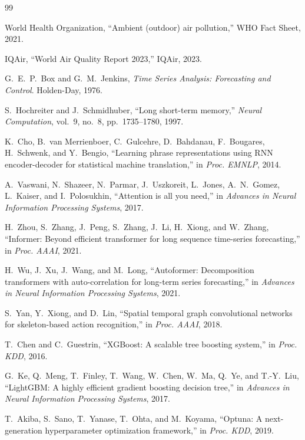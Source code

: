 \begin{thebibliography}{99}

World Health Organization, ``Ambient (outdoor) air pollution,'' WHO Fact Sheet, 2021.

IQAir, ``World Air Quality Report 2023,'' IQAir, 2023.

G.~E.~P.~Box and G.~M.~Jenkins, \textit{Time Series Analysis: Forecasting and Control}. Holden-Day, 1976.

S.~Hochreiter and J.~Schmidhuber, ``Long short-term memory,'' \textit{Neural Computation}, vol.~9, no.~8, pp.~1735--1780, 1997.

K.~Cho, B.~van Merrienboer, C.~Gulcehre, D.~Bahdanau, F.~Bougares, H.~Schwenk, and Y.~Bengio, ``Learning phrase representations using RNN encoder-decoder for statistical machine translation,'' in \textit{Proc. EMNLP}, 2014.

A.~Vaswani, N.~Shazeer, N.~Parmar, J.~Uszkoreit, L.~Jones, A.~N.~Gomez, L.~Kaiser, and I.~Polosukhin, ``Attention is all you need,'' in \textit{Advances in Neural Information Processing Systems}, 2017.

H.~Zhou, S.~Zhang, J.~Peng, S.~Zhang, J.~Li, H.~Xiong, and W.~Zhang, ``Informer: Beyond efficient transformer for long sequence time-series forecasting,'' in \textit{Proc. AAAI}, 2021.

H.~Wu, J.~Xu, J.~Wang, and M.~Long, ``Autoformer: Decomposition transformers with auto-correlation for long-term series forecasting,'' in \textit{Advances in Neural Information Processing Systems}, 2021.

S.~Yan, Y.~Xiong, and D.~Lin, ``Spatial temporal graph convolutional networks for skeleton-based action recognition,'' in \textit{Proc. AAAI}, 2018.

T.~Chen and C.~Guestrin, ``XGBoost: A scalable tree boosting system,'' in \textit{Proc. KDD}, 2016.

G.~Ke, Q.~Meng, T.~Finley, T.~Wang, W.~Chen, W.~Ma, Q.~Ye, and T.-Y.~Liu, ``LightGBM: A highly efficient gradient boosting decision tree,'' in \textit{Advances in Neural Information Processing Systems}, 2017.

T.~Akiba, S.~Sano, T.~Yanase, T.~Ohta, and M.~Koyama, ``Optuna: A next-generation hyperparameter optimization framework,'' in \textit{Proc. KDD}, 2019.


\end{thebibliography}
